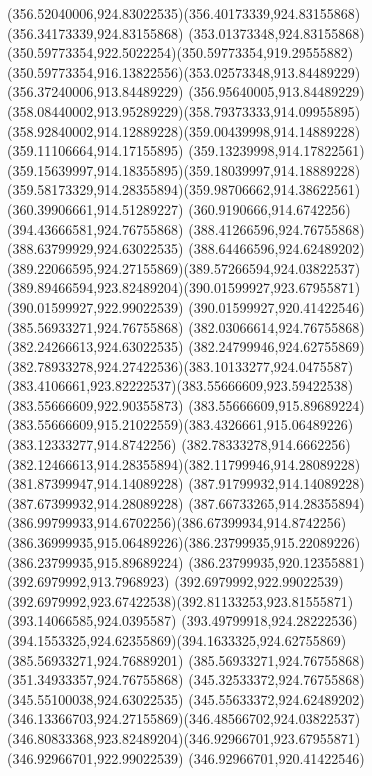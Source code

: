 {{{{				\curveto(356.52040006,924.83022535)(356.40173339,924.83155868)(356.34173339,924.83155868)
				\curveto(353.01373348,924.83155868)(350.59773354,922.5022254)(350.59773354,919.29555882)
				\curveto(350.59773354,916.13822556)(353.02573348,913.84489229)(356.37240006,913.84489229)
				\curveto(356.95640005,913.84489229)(358.08440002,913.95289229)(358.79373333,914.09955895)
				\curveto(358.92840002,914.12889228)(359.00439998,914.14889228)(359.11106664,914.17155895)
				\curveto(359.13239998,914.17822561)(359.15639997,914.18355895)(359.18039997,914.18889228)
				\curveto(359.58173329,914.28355894)(359.98706662,914.38622561)(360.39906661,914.51289227)
				\lineto(360.9190666,914.6742256)
				\closepath
				\moveto(394.43666581,924.76755868)
				\lineto(388.41266596,924.76755868)
				\lineto(388.63799929,924.63022535)
				\curveto(388.64466596,924.62489202)(389.22066595,924.27155869)(389.57266594,924.03822537)
				\curveto(389.89466594,923.82489204)(390.01599927,923.67955871)(390.01599927,922.99022539)
				\lineto(390.01599927,920.41422546)
				\lineto(385.56933271,924.76755868)
				\lineto(382.03066614,924.76755868)
				\lineto(382.24266613,924.63022535)
				\curveto(382.24799946,924.62755869)(382.78933278,924.27422536)(383.10133277,924.0475587)
				\curveto(383.4106661,923.82222537)(383.55666609,923.59422538)(383.55666609,922.90355873)
				\lineto(383.55666609,915.89689224)
				\curveto(383.55666609,915.21022559)(383.4326661,915.06489226)(383.12333277,914.8742256)
				\curveto(382.78333278,914.6662256)(382.12466613,914.28355894)(382.11799946,914.28089228)
				\lineto(381.87399947,914.14089228)
				\lineto(387.91799932,914.14089228)
				\lineto(387.67399932,914.28089228)
				\curveto(387.66733265,914.28355894)(386.99799933,914.6702256)(386.67399934,914.8742256)
				\curveto(386.36999935,915.06489226)(386.23799935,915.22089226)(386.23799935,915.89689224)
				\lineto(386.23799935,920.12355881)
				\lineto(392.6979992,913.7968923)
				\lineto(392.6979992,922.99022539)
				\curveto(392.6979992,923.67422538)(392.81133253,923.81555871)(393.14066585,924.0395587)
				\curveto(393.49799918,924.28222536)(394.1553325,924.62355869)(394.1633325,924.62755869)
				\closepath
				\moveto(385.56933271,924.76889201)
				\lineto(385.56933271,924.76755868)
				\closepath
				\moveto(351.34933357,924.76755868)
				\lineto(345.32533372,924.76755868)
				\lineto(345.55100038,924.63022535)
				\curveto(345.55633372,924.62489202)(346.13366703,924.27155869)(346.48566702,924.03822537)
				\curveto(346.80833368,923.82489204)(346.92966701,923.67955871)(346.92966701,922.99022539)
				\lineto(346.92966701,920.41422546)
}}}}
